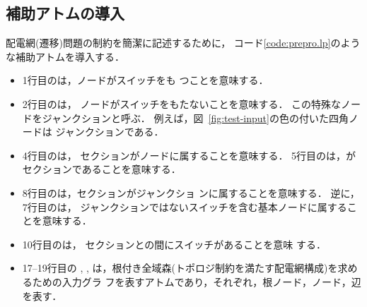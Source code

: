 \subsection{補助アトムの導入}\label{chap:prepro}



配電網(遷移)問題の制約を簡潔に記述するために，
コード\ref{code:prepro.lp}のような補助アトムを導入する．
\begin{itemize}
\item 1行目のは，ノードがスイッチをも
  つことを意味する．
\item 2行目のは，
  ノードがスイッチをもたないことを意味する．
  この特殊なノードをジャンクションと呼ぶ．
  例えば，図~\ref{fig:test-input}の色の付いた四角ノードは
  ジャンクションである．
\item 4行目のは，
  セクションがノードに属することを意味する．
  5行目のは，がセクションであることを意味する．
\item 8行目のは，セクションがジャンクショ
  ンに属することを意味する．
  逆に，7行目のは，
  ジャンクションではないスイッチを含む基本ノードに属することを意味する．
\item 10行目のは，
  セクションとの間にスイッチがあることを意味
  する．
\item 17--19行目の
,
,
は，根付き全域森(トポロジ制約を満たす配電網構成)を求めるための入力グラ
フを表すアトムであり，それぞれ，根ノード，ノード，辺を表す．


\end{itemize}
